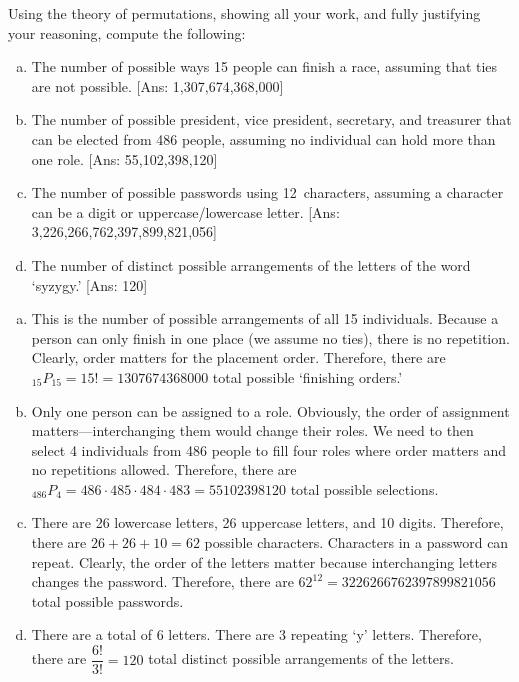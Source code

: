 \documentclass[11pt,letterpaper]{article}
\begin{document}
 Using the theory of permutations, showing all your work, and fully justifying your reasoning, compute the following:
	\begin{enumerate}[(a)]
	\item The number of possible ways 15 people can finish a race, assuming that ties are not possible. [Ans: 1,307,674,368,000]
	\item The number of possible president, vice president, secretary, and treasurer that can be elected from 486 people, assuming no individual can hold more than one role. [Ans: 55,102,398,120]
	\item The number of possible passwords using 12~characters, assuming a character can be a digit or uppercase/lowercase letter. [Ans: 3,226,266,762,397,899,821,056]
	\item The number of distinct possible arrangements of the letters of the word `syzygy.' [Ans: 120]
	\end{enumerate} \pspace

\sol 
\begin{enumerate}[(a)]
\item This is the number of possible arrangements of all 15 individuals. Because a person can only finish in one place (we assume no ties), there is no repetition. Clearly, order matters for the placement order. Therefore, there are $_{15}P_{15}= 15!= 1307674368000$ total possible `finishing orders.' \pspace

\item Only one person can be assigned to a role. Obviously, the order of assignment matters---interchanging them would change their roles. We need to then select 4 individuals from 486 people to fill four roles where order matters and no repetitions allowed. Therefore, there are $_{486}P_4= 486 \cdot 485 \cdot 484 \cdot 483=  55102398120$ total possible selections. \pspace

\item There are 26 lowercase letters, 26 uppercase letters, and 10 digits. Therefore, there are $26 + 26 + 10= 62$ possible characters. Characters in a password can repeat. Clearly, the order of the letters matter because interchanging letters changes the password. Therefore, there are $62^{12}= 3226266762397899821056$ total possible passwords. \pspace

\item There are a total of 6 letters. There are 3 repeating `y' letters. Therefore, there are $\dfrac{6!}{3!}= 120$ total distinct possible arrangements of the letters. 
\end{enumerate}
\end{document}
